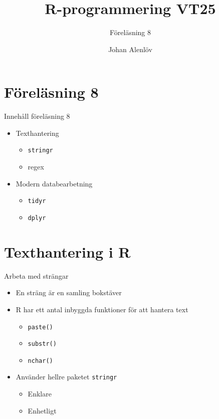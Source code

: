 \documentclass[
  10pt,
  ignorenonframetext,
  handout]{beamer}
\title{R-programmering VT25}
\subtitle{Föreläsning 8}
\author{Johan Alenlöv}
\date{}
\institute{Linköpings Universitet}
\providecommand{\tightlist}{%
  \setlength{\itemsep}{0pt}\setlength{\parskip}{0pt}}
\begin{document}
\frame{\titlepage}

\section{Föreläsning 8}\label{fuxf6reluxe4sning-8}

\begin{frame}{Innehåll föreläsning 8}
\label{innehuxe5ll-fuxf6reluxe4sning-8}
\begin{itemize}
\tightlist
\item
  Texthantering

  \begin{itemize}
  \tightlist
  \item
    \texttt{stringr}
  \item
    regex
  \end{itemize}
\item
  Modern databearbetning

  \begin{itemize}
  \tightlist
  \item
    \texttt{tidyr}
  \item
    \texttt{dplyr}
  \end{itemize}
\end{itemize}
\end{frame}

\section{Texthantering i R}\label{texthantering-i-r}

\begin{frame}{Arbeta med strängar}
\label{arbeta-med-struxe4ngar}
\begin{itemize}
\tightlist
\item
  En sträng är en samling bokstäver
\item
  R har ett antal inbyggda funktioner för att hantera text

  \begin{itemize}
  \tightlist
  \item
    \texttt{paste()}
  \item
    \texttt{substr()}
  \item
    \texttt{nchar()}
  \end{itemize}
\item
  Använder hellre paketet \texttt{stringr}

  \begin{itemize}
  \tightlist
  \item
    Enklare
  \item
    Enhetligt
  \end{itemize}
\end{itemize}
\end{frame}
\end{document}
